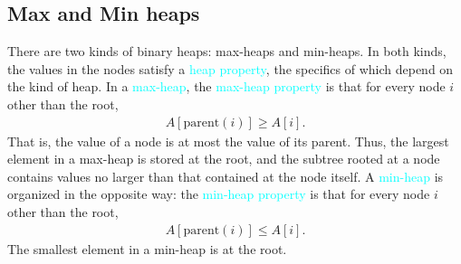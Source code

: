 \documentclass{report}
\begin{document}
\subsection{Max and Min heaps}
\bigbreak \noindent 
There are two kinds of binary heaps: max-heaps and min-heaps. In both kinds, the values in the nodes satisfy a \textcolor{cyan}{heap property}, the specifics of which depend on the kind of heap. In a \textcolor{cyan}{max-heap}, the \textcolor{cyan}{max-heap property} is that for every node $i$ other than the root,
\bigbreak \noindent 
\begin{align*}
    A[\text{parent}(i)] \geq A[i]
.\end{align*}
\bigbreak \noindent 
That is, the value of a node is at most the value of its parent. Thus, the largest
element in a max-heap is stored at the root, and the subtree rooted at a node contains
values no larger than that contained at the node itself. A \textcolor{cyan}{min-heap} is organized in
the opposite way: the \textcolor{cyan}{min-heap property} is that for every node $i$ other than the
root,
\bigbreak \noindent 
\begin{align*}
    A[\text{parent}(i)] \leq A[i]
.\end{align*}
\bigbreak \noindent 
The smallest element in a min-heap is at the root.
\bigbreak \noindent 
\end{document}
